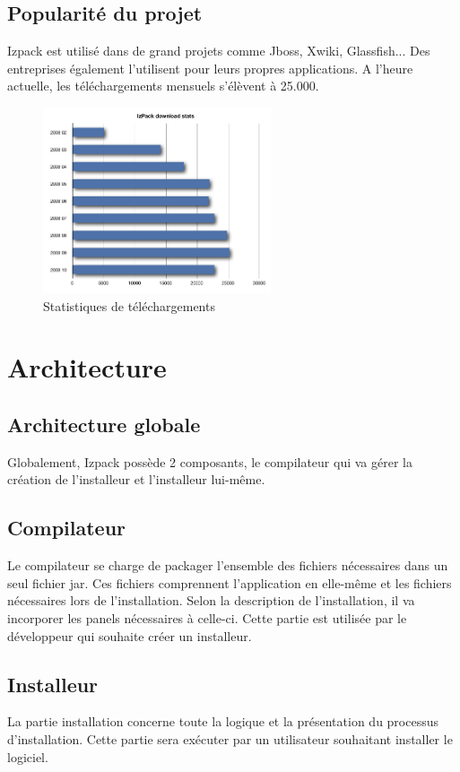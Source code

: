 \subsection{Popularité du projet}
Izpack est utilisé dans de grand projets comme Jboss, Xwiki, Glassfish... Des entreprises également l'utilisent pour leurs propres applications. A l'heure actuelle, les téléchargements mensuels s'élèvent à 25.000.
\begin{figure}[H]
	\centering
	\includegraphics[width=0.6\textwidth]{../image/telechargements.png}
	\caption{Statistiques de téléchargements}
\end{figure}
\section{Architecture}
\subsection{Architecture globale}
Globalement, Izpack possède 2 composants, le compilateur qui va gérer la création de l'installeur et l'installeur lui-même.
\subsection{Compilateur}
Le compilateur se charge de packager l'ensemble des fichiers nécessaires dans un seul fichier jar.
Ces fichiers comprennent l'application en elle-même et les fichiers nécessaires lors de l'installation. 
Selon la description de l'installation, il va incorporer les panels nécessaires à celle-ci.
Cette partie est utilisée par le développeur qui souhaite créer un installeur.
\subsection{Installeur}
La partie installation concerne toute la logique et la présentation du processus d'installation. Cette partie sera exécuter par un utilisateur souhaitant installer le logiciel.
